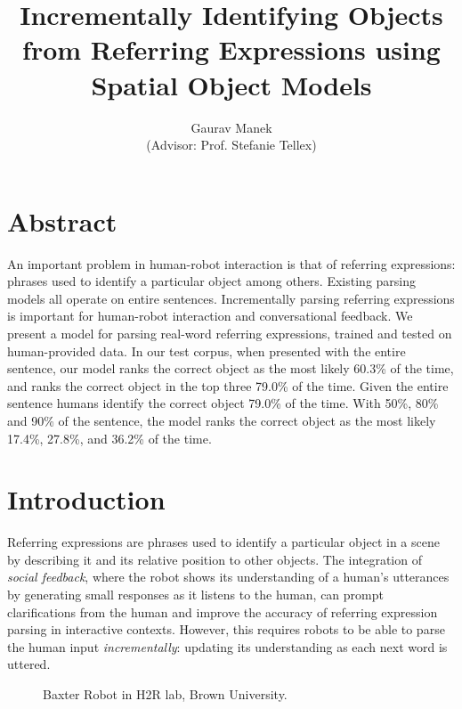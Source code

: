 \documentclass[conference]{IEEEtran}
\title{Incrementally Identifying Objects from Referring Expressions using Spatial Object Models}
\author{Gaurav Manek\\(Advisor: Prof. Stefanie Tellex)}
\numberwithin{equation}{section}
\begin{document}
\maketitle

\section{Abstract}
An important problem in human-robot interaction is that of referring expressions: phrases used to identify a particular object among others. Existing parsing models all operate on entire sentences. Incrementally parsing referring expressions is important for human-robot interaction and conversational feedback. We present a model for parsing real-word referring expressions, trained and tested on human-provided data. In our test corpus, when presented with the entire sentence, our model ranks the correct object as the most likely 60.3\% of the time, and ranks the correct object in the top three 79.0\% of the time. Given the entire sentence humans identify the correct object 79.0\% of the time. With 50\%, 80\% and 90\% of the sentence, the model ranks the correct object as the most likely 17.4\%, 27.8\%, and 36.2\% of the time.


\section{Introduction}

Referring expressions are phrases used to identify a particular object in a scene by describing it and its relative position to other objects. The integration of \emph{social feedback}, where the robot shows its understanding of a human's utterances by generating small responses as it listens to the human, can prompt clarifications from the human and improve the accuracy of referring expression parsing in interactive contexts. However, this requires robots to be able to parse the human input \emph{incrementally}: updating its understanding as each next word is uttered. 


\begin{figure}[!tb]
  \centering
  \label{fig:robot}

  \caption{Baxter Robot in H2R lab, Brown University.}
\end{figure}
\end{document}
